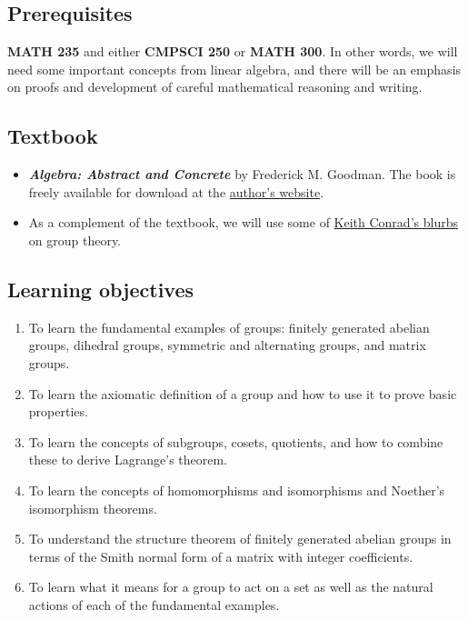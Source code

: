 \documentclass[11pt]{article}
\begin{document}
\subsection*{Prerequisites}
\label{sec:org5f9e9ff}
\textbf{MATH 235} and either \textbf{CMPSCI 250} or \textbf{MATH 300}. In other words, we will need
some important concepts from linear algebra, and there will be an emphasis on
proofs and development of careful mathematical reasoning and writing.

\subsection*{Textbook}
\label{sec:orgd492060}
\begin{itemize}
\item \textbf{\emph{Algebra: Abstract and Concrete}} by Frederick M. Goodman. The book is
freely available for download at the \href{https://homepage.divms.uiowa.edu/\~goodman/algebrabook.dir/algebrabook.html}{author's website}.
\item As a complement of the textbook, we will use some of \href{https://kconrad.math.uconn.edu/blurbs/}{Keith Conrad's blurbs} on
group theory.
\end{itemize}

\subsection*{Learning objectives}
\label{sec:org208c701}

\begin{enumerate}
\item To learn the fundamental examples of groups: finitely generated abelian
groups, dihedral groups, symmetric and alternating groups, and matrix
groups.
\item To learn the axiomatic definition of a group and how to use it to prove
basic properties.
\item To learn the concepts of subgroups, cosets, quotients, and how to combine
these to derive Lagrange’s theorem.
\item To learn the concepts of homomorphisms and isomorphisms and Noether's
isomorphism theorems.
\item To understand the structure theorem of finitely generated abelian groups in
terms of the Smith normal form of a matrix with integer coefficients.
\item To learn what it means for a group to act on a set as well as the
natural actions of each of the fundamental examples.
\end{enumerate}
\end{document}
